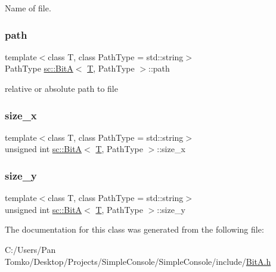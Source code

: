 Name of file. 

\mbox{\label{classsc_1_1_bit_a_a64708706afe986a022ec7eee4a75aca5}} 
\subsubsection{\texorpdfstring{path}{path}}
{\footnotesize\ttfamily template$<$class T, class Path\+Type = std\+::string$>$ \\
Path\+Type \mbox{\hyperlink{classsc_1_1_bit_a}{sc\+::\+BitA}}$<$ \mbox{\hyperlink{_keyboard_event_8h_adf1f3edb9115acb0a1e04209b7a9937b}{T}}, Path\+Type $>$\+::path}



relative or absolute path to file 

\mbox{\label{classsc_1_1_bit_a_ae9ada64952c1dd3df063eb63e79651a1}} 
\subsubsection{\texorpdfstring{size\_x}{size\_x}}
{\footnotesize\ttfamily template$<$class T, class Path\+Type = std\+::string$>$ \\
unsigned int \mbox{\hyperlink{classsc_1_1_bit_a}{sc\+::\+BitA}}$<$ \mbox{\hyperlink{_keyboard_event_8h_adf1f3edb9115acb0a1e04209b7a9937b}{T}}, Path\+Type $>$\+::size\+\_\+x}

\mbox{\label{classsc_1_1_bit_a_a9309d66c6d75ae9dfda2be5dbfcd4b05}} 
\subsubsection{\texorpdfstring{size\_y}{size\_y}}
{\footnotesize\ttfamily template$<$class T, class Path\+Type = std\+::string$>$ \\
unsigned int \mbox{\hyperlink{classsc_1_1_bit_a}{sc\+::\+BitA}}$<$ \mbox{\hyperlink{_keyboard_event_8h_adf1f3edb9115acb0a1e04209b7a9937b}{T}}, Path\+Type $>$\+::size\+\_\+y}



The documentation for this class was generated from the following file\+:\begin{DoxyCompactItemize}
\item 
C\+:/\+Users/\+Pan Tomko/\+Desktop/\+Projects/\+Simple\+Console/\+Simple\+Console/include/\mbox{\hyperlink{_bit_a_8h}{Bit\+A.\+h}}\end{DoxyCompactItemize}
